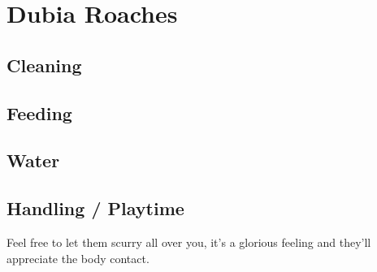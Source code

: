 \chapter{Dubia Roaches}

\section{Cleaning}


\section{Feeding}
\section{Water}

\section{Handling / Playtime}
Feel free to let them scurry all over you, it's a glorious feeling and they'll appreciate the body contact.

